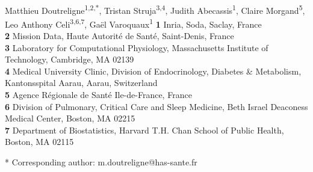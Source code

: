 \documentclass[10pt,letterpaper]{article}
\begin{document}
\vspace*{0.2in}

\begin{flushleft}
  {\Large
    \textbf{} %
  }
  \newline
  \\
  Matthieu Doutreligne\textsuperscript{1,2,*},
  Tristan Struja\textsuperscript{3,4},
  Judith Abecassis\textsuperscript{1},
  Claire Morgand\textsuperscript{5},
  Leo Anthony Celi\textsuperscript{3,6,7},
  Gaël Varoquaux\textsuperscript{1}
  \bigskip
  \textbf{1} Inria, Soda, Saclay, France
  \\
  \textbf{2} Mission Data, Haute Autorité de Santé, Saint-Denis, France
  \\
  \textbf{3} Laboratory for Computational Physiology, Massachusetts Institute of Technology, Cambridge, MA 02139
  \\
  \textbf{4} Medical University Clinic, Division of Endocrinology, Diabetes \& Metabolism, Kantonsspital Aarau, Aarau, Switzerland
  \\
  \textbf{5} Agence Régionale de Santé Ile-de-France, France
  \\
  \textbf{6} Division of Pulmonary, Critical Care and Sleep Medicine, Beth Israel Deaconess Medical Center, Boston, MA 02215
  \\
  \textbf{7} Department of Biostatistics, Harvard T.H. Chan School of Public Health, Boston, MA 02115
  \bigskip









  * Corresponding author: m.doutreligne@has-sante.fr

\end{flushleft}
\end{document}
